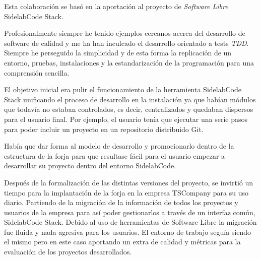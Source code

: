 \par Esta colaboraci\'on se bas\'o en la aportaci\'on al proyecto de \emph{Software Libre} SidelabCode Stack.

\par Profesionalmente siempre he tenido ejemplos cercanos acerca del desarrollo de software de calidad y me ha han inculcado el desarrollo orientado a tests \emph{TDD}. Siempre he perseguido la simplicidad y de esta forma la replicaci\'on de un entorno, pruebas, instalaciones y la estandarizaci\'on de la programaci\'on para una comprensi\'on sencilla.

\par El objetivo inicial era pulir el funcionamiento de la herramienta SidelabCode Stack unificando el proceso de desarrollo en la instalaci\'on ya que hab\'ian m\'odulos que todav\'ia no estaban controlados, es decir, centralizados y quedaban dispersos para el usuario final. Por ejemplo, el usuario ten\'ia que ejecutar una serie pasos para poder incluir un proyecto en un repositorio distribuido Git.

\par Hab\'ia que dar forma al modelo de desarrollo y promocionarlo dentro de la estructura de la forja para que resultase f\'acil para el usuario empezar a desarrollar su proyecto dentro del entorno SidelabCode.

\par Despu\'es de la formalizaci\'on de las distintas versiones del proyecto, se invirti\'o un tiempo para la implantaci\'on de la forja en la empresa TSCompany para su uso diario. Partiendo de la migraci\'on de la informaci\'on de todos los proyectos y usuarios de la empresa para as\'i poder gestionarlos a trav\'es de un interfaz com\'un, SidelabCode Stack. Debido al uso de herramientas de Software Libre la migraci\'on fue fluida y nada agresiva para los usuarios. El entorno de trabajo segu\'ia siendo el mismo pero en este caso aportando un extra de calidad y m\'etricas para la evaluaci\'on de los proyectos desarrollados.

